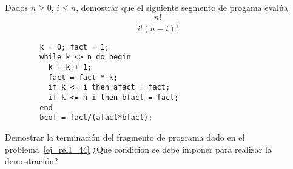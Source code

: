 \begin{ejercicio}
    Dados $n\geq 0$, $i\leq n$, demostrar que el siguiente segmento de progama evalúa
    \begin{equation*}
        \dfrac{n!}{i!(n-i)!}
    \end{equation*}
    \begin{verbatim}
        k = 0; fact = 1;
        while k <> n do begin
          k = k + 1;
          fact = fact * k;
          if k <= i then afact = fact;
          if k <= n-i then bfact = fact;
        end
        bcof = fact/(afact*bfact);
    \end{verbatim}
\end{ejercicio}

\begin{ejercicio}
    Demostrar la terminación del fragmento de programa dado en el problema~\ref{ej_rel1_44} ¿Qué condición se debe imponer para realizar la demostración?
\end{ejercicio}
